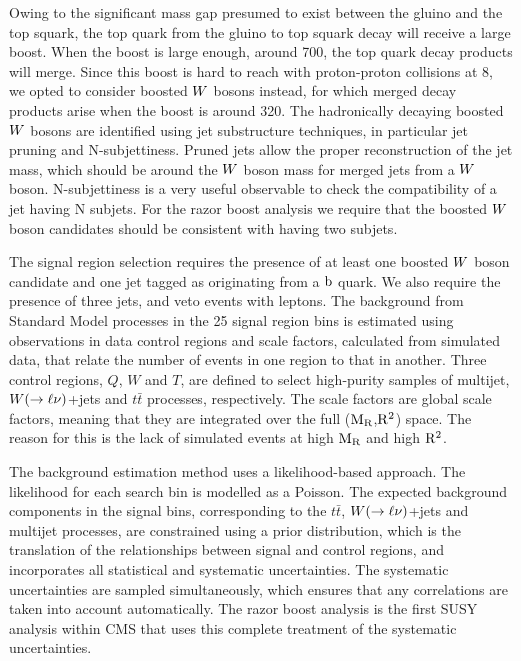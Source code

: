 Owing to the significant mass gap presumed to exist between the gluino and the top squark, the
top quark from the gluino to top squark decay will receive a large boost. 
When the boost is large enough, around 700\GeV, the top quark decay products will merge. Since this
boost is hard to reach with proton-proton collisions at 8\TeV, we opted to consider boosted $W$
bosons instead, for which merged decay products arise when the boost is around 320\GeV. 
The hadronically decaying boosted $W$ bosons are identified using jet substructure techniques, in
particular jet pruning and N-subjettiness. Pruned jets allow the proper reconstruction of the
jet mass, which should be around the $W$ boson mass for merged jets from a $W$ boson. 
N-subjettiness is a very useful observable to check the compatibility of a jet having N subjets.
For the razor boost analysis we require that the boosted $W$ boson candidates should be consistent
with having two subjets. 


The signal region selection requires the presence of at least one boosted $W$ boson candidate and
one jet tagged as originating from a $\mathrm{b}$ quark. We also require the presence of three jets, and
veto events with leptons. 
The background from Standard Model processes in the 25 signal region bins is estimated using
observations in data control regions and scale factors, calculated from simulated data, that
relate the number of events in one region to that in another. 
Three control regions, $Q$, $W$ and $T$, are defined to select high-purity samples of multijet,
$W (\rightarrow \ell \nu)$+jets and $t\bar{t}$ processes, respectively. 
The scale factors are global scale factors, meaning that they are integrated over the full
($\mathrm{M_R}$,$\mathrm{R^2}$) space. The reason for this is the lack of simulated events at high $\mathrm{M_R}$ and high
$\mathrm{R^2}$. 

The background estimation method uses a likelihood-based approach. 
The likelihood for each search bin is modelled as a Poisson. The expected background
components in the signal bins, corresponding to the $t\bar{t}$, $W (\rightarrow \ell \nu)$+jets and
multijet processes, are constrained using a prior distribution, which is the translation of the
relationships between signal and control regions, and incorporates all statistical and systematic
uncertainties. 
The systematic uncertainties are sampled simultaneously, which ensures that any correlations are
taken into account automatically. The razor boost analysis is the first SUSY analysis within CMS
that uses this complete treatment of the systematic uncertainties. 

